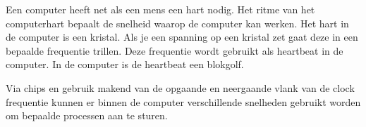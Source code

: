 Een computer heeft net als een mens een hart nodig. Het ritme van het computerhart bepaalt de snelheid waarop de computer kan werken. Het hart in de computer is een kristal. Als je een spanning op een kristal zet gaat deze in een bepaalde frequentie trillen. Deze frequentie wordt gebruikt als heartbeat in de computer. In de computer is de heartbeat een blokgolf.

Via chips en gebruik makend van de opgaande en neergaande vlank van de clock frequentie kunnen er binnen de computer verschillende snelheden gebruikt worden om bepaalde processen aan te sturen.

